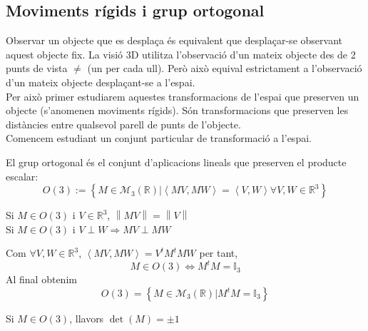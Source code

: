 \documentclass[a4paper,12pt]{article}
\begin{document}
	\subsection{Moviments rígids i grup ortogonal}

	Observar un objecte que es desplaça és equivalent que desplaçar-se observant aquest objecte fix. La visió 3D utilitza l'observació d'un mateix objecte des de 2 punts de vista $\neq$ (un per cada ull). Però això equival estrictament a l'observació d'un mateix objecte desplaçant-se a l'espai.\\
	Per això primer estudiarem aquestes transformacions de l'espai que preserven un objecte (s'anomenen moviments rígids). Són transformacions que preserven les distàncies entre qualsevol parell de punts de l'objecte.\\
	Comencem estudiant un conjunt particular de transformació a l'espai.

	\begin{definicio}
	    El grup ortogonal és el conjunt d'aplicacions lineals que preserven el producte escalar:
	    \begin{displaymath}
	        O(3) := \left\{M \in \mathcal{M}_3\left(\mathbb{R}\right) | \left\langle MV, MW \right\rangle = \left\langle V, W\right\rangle \forall V, W \in \mathbb{R}^3 \right\}
	    \end{displaymath}
	\end{definicio}

	\begin{obs}
	    Si $M \in O(3)$ i $V \in \mathbb{R}^3$, $\left\lVert MV\right\rVert = \left\lVert V\right\rVert$\\
	    Si $M\in O(3)$ i $V\perp W \Rightarrow MV \perp MW$
	\end{obs}

	Com $\forall V, W \in \mathbb{R}^3$, $\left\langle MV, MW\right\rangle = V^tM^tMW$ per tant,
	\begin{displaymath}
	    M \in O(3) \Leftrightarrow M^tM = \mathbb{I}_3
	\end{displaymath}
	Al final obtenim
	\begin{displaymath}
	    O(3) = \left\{M \in \mathcal{M}_3\left(\mathbb{R}\right) | M^tM = \mathbb{I}_3\right\}
	\end{displaymath}

	\begin{proposicio}
	    Si $M \in O(3)$, llavors $\det\left(M\right) = \pm 1$
	\end{proposicio}
\end{document}
